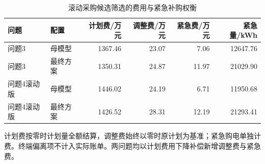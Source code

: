 \begin{table}[htbp]\centering\small
\caption{滚动采购候选筛选的费用与紧急补购权衡}
\label{tab:outer_screening_tradeoff}
\begin{tabularx}{\linewidth}{LLRRRR}\toprule
问题 & 配置 & 计划费/万元 & 调整费/万元 & 紧急费/万元 & 紧急量/kWh\\\midrule
问题3 & 母模型 & 1367.46 & 23.07 & 7.06 & 12647.76\\
问题3 & 最终方案 & 1350.31 & 24.87 & 11.97 & 21029.90\\
问题4滚动版 & 母模型 & 1446.02 & 24.19 & 6.71 & 11950.68\\
问题4滚动版 & 最终方案 & 1426.52 & 28.31 & 12.19 & 21293.41\\
\bottomrule\end{tabularx}
\par\smallskip\parbox{\linewidth}{\footnotesize 计划费按零时计划量全额结算，调整费始终以零时原计划为基准；紧急购电单独计费。终端偏离项不计入实际账单。两问题均以计划费用下降补偿新增调整费与紧急费。}
\end{table}
